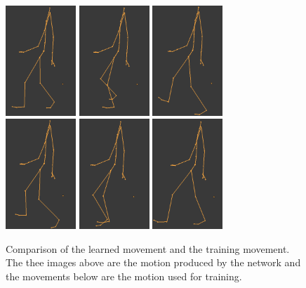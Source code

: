 \documentclass[letterpaper,9pt]{article}
\begin{document}
\begin{figure}[h!]
  \centering
  \includegraphics[width=100px]{Extra/out_simple_walk_1.png}
  \includegraphics[width=100px]{Extra/out_simple_walk_2.png}
  \includegraphics[width=100px]{Extra/out_simple_walk_3.png}\\
  \includegraphics[width=100px]{Extra/teach_simple_walk_1.png}
  \includegraphics[width=100px]{Extra/teach_simple_walk_2.png}
  \includegraphics[width=100px]{Extra/teach_simple_walk_3.png}
    \caption[Simple Walk]{Comparison of the learned movement and the training movement. The thee images above are the motion produced by the network and the movements below are the motion used for training.}
\end{figure}
\end{document}
